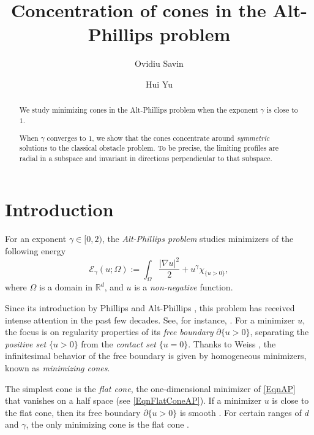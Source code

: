 \documentclass{amsart}
\title{Concentration of  cones in the Alt-Phillips problem}
\author{Ovidiu Savin}
\author{Hui Yu}
\def\R {\mathbb{R}}
\def\PosS{\{u>0\}}
\def\ConS{\{u=0\}}
\def\PPosS{\partial\{u>0\}}
\def\Diri{|\nabla u|^2}
\theoremstyle{definition}
\numberwithin{equation}{section}
\theoremstyle{remark}
\begin{document}
\begin{abstract}
We study minimizing cones in the Alt-Phillips problem when the exponent $\gamma$ is close to $1$.

When $\gamma$ converges to $1$, we show that the cones concentrate around \textit{symmetric} solutions to the classical obstacle problem. To be precise, the limiting profiles are radial in a subspace and invariant in directions perpendicular to that subspace. 




\end{abstract}
\maketitle



\section{Introduction}

For an exponent $\gamma\in[0,2)$, the \textit{Alt-Phillips problem} studies minimizers of the following energy
\begin{equation}
\label{EqnAP}
\mathcal{E}_\gamma(u;\Omega):=\int_{\Omega}\frac{\Diri}{2}+u^\gamma\chi_{\{u>0\}},
\end{equation} 
where $\Omega$ is a domain in $\R^{d}$, and $u$ is a \textit{non-negative} function. 

Since its introduction by Phillips \cite{P} and Alt-Phillips \cite{AP}, this problem has received intense attention in the past few decades. See, for instance, \cite{AS, B, DS, FeRo, FeY, FeY2,KSP, WY,WaY}. For a minimizer $u$, the focus is on regularity properties of its \textit{free boundary} $\PPosS$, separating the \textit{positive set} $\PosS$ from the \textit{contact set} $\ConS$. Thanks to Weiss \cite{W}, the infinitesimal behavior of the free boundary is given by homogeneous minimizers, known as \textit{minimizing cones}. 

The simplest  cone is the \textit{flat cone}, the one-dimensional minimizer of \eqref{EqnAP} that vanishes on a half space (see \eqref{EqnFlatConeAP}). If a minimizer $u$ is close to the flat cone, then its free boundary $\PPosS$ is smooth \cite{AP, D, DS, ReRo}. For certain ranges of $d$ and $\gamma$, the only minimizing cone is the flat cone \cite{AP, CJK, JS}. 
\end{document}
